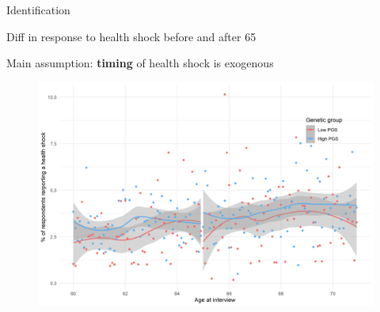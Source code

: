 \documentclass[10pt,compress,xcolor=dvipsnames,aspectratio=169]{beamer}    %
\newcounter{ex}
\newcommand{\1}[1]{\mathrm{1\hspace*{-2.5pt}l}[#1]}	%
\begin{document}
\begin{frame}{Identification}\label{frame:id}

Diff in response to health shock before and after 65


Main assumption: \textbf{timing} of health shock is exogenous \cite{Marti2017,Card2009medicare}


\begin{figure}[hbtp]
\centering
\includegraphics[width=0.9\textheight]{../../3_output/over_time/graph_6070cvrdd_agebypgs.png}
\label{fig:cv_prob_rdd}
\end{figure}


%
%
\end{frame}
\end{document}
